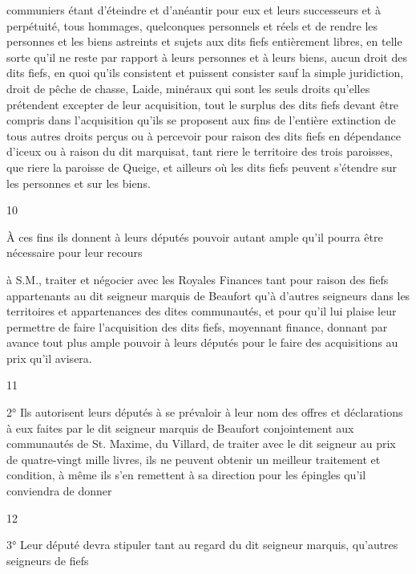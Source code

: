 \documentclass[a4paper,twoside,openany]{article}
\begin{document}

communiers étant d’éteindre et d’anéantir pour eux et
leurs successeurs et à perpétuité, tous hommages,
quelconques personnels et réels et de rendre les
personnes et les biens astreints et sujets aux dits fiefs
entièrement libres, en telle sorte qu’il ne reste
par rapport à leurs personnes et à leurs biens, aucun
droit des dits fiefs, en quoi qu’ils consistent et puissent consister
sauf la simple juridiction, \gls{droit de pêche de chasse},
\gls{Laide}, minéraux qui sont les seuls droits qu’elles
prétendent excepter de leur acquisition, tout le surplus
des dits fiefs devant être compris dans l’acquisition
qu’ils se proposent aux fins de l’entière extinction
de tous autres droits perçus ou à percevoir pour raison
des dits fiefs en dépendance d’iceux ou à raison du
dit marquisat, tant riere le territoire des trois paroisses,
que riere la paroisse de Queige, et ailleurs où les dits
fiefs peuvent s’étendre sur les personnes et sur les
biens.

\begin{center}
10
\end{center}
À ces fins ils donnent à leurs députés pouvoir autant
ample qu’il pourra être nécessaire pour leur recours


à S.M., traiter et négocier avec les Royales
Finances tant pour raison des fiefs appartenants au dit
seigneur marquis de Beaufort  qu’à d’autres seigneurs
dans les territoires et appartenances des dites communautés,
et pour qu’il lui plaise leur permettre de faire
l’acquisition des dits fiefs, moyennant finance, donnant
par avance tout plus ample pouvoir à leurs députés
pour le faire des acquisitions au prix qu’il avisera.

\begin{center}
11
\end{center}
2° Ils autorisent leurs députés à se prévaloir à leur
nom des offres et déclarations à eux faites par
le dit seigneur marquis de Beaufort conjointement
aux communautés de St. Maxime, du Villard, de
traiter avec le dit seigneur au prix de quatre-vingt
mille livres, ils ne peuvent obtenir un meilleur
traitement et condition, à même ils s’en remettent
à sa direction pour les épingles qu’il conviendra de
donner
\begin{center}
12
\end{center}
3° Leur député devra stipuler tant au regard du dit
seigneur marquis, qu’autres seigneurs de fiefs
\end{document}
